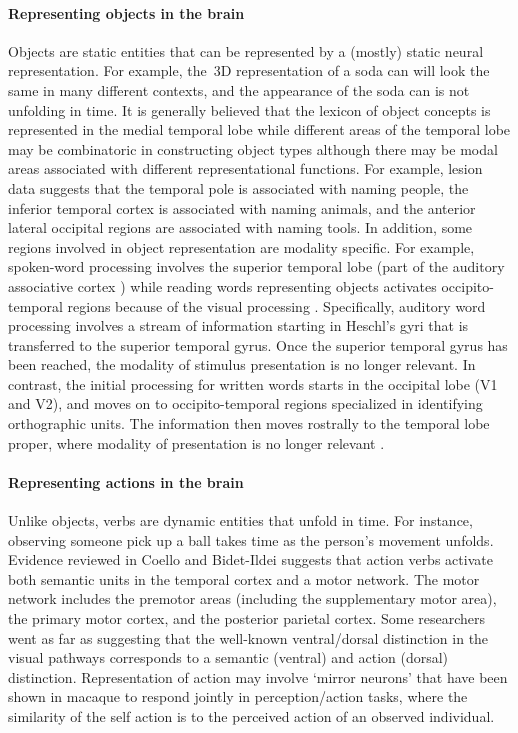 \paragraph{Representing objects in the brain}
%
Objects are static entities that can be represented by a (mostly) static
neural representation.
%
For example, the~3D representation of a soda can will look the same in many
different contexts, and the appearance of the soda can is not unfolding in
time.
%
It is generally believed that the lexicon of object concepts is represented in
the medial temporal lobe while different areas of the temporal lobe may be
combinatoric in constructing object types \citep{hanson2004combinatorial}
although there may be modal areas associated with different representational
functions.
%
For example, lesion data suggests that the temporal pole is associated with
naming people, the inferior temporal cortex is associated with naming
animals, and the anterior lateral occipital regions are associated with naming
tools.
%
In addition, some regions involved in object representation are
modality specific.
%
For example, spoken-word processing involves the superior temporal lobe (part
of the auditory associative cortex \citep{binder2000human}) while reading
words representing objects activates occipito-temporal regions because of the
visual processing \citep{puce1996differential}.
%
Specifically, auditory word processing involves a stream of information
starting in Heschl's gyri that is transferred to the superior temporal gyrus.
%
Once the superior temporal gyrus has been reached, the modality of stimulus
presentation is no longer relevant.
%
In contrast, the initial processing for written words starts in the occipital
lobe (V1 and V2), and moves on to occipito-temporal regions specialized in
identifying orthographic units.
%
The information then moves rostrally to the temporal lobe proper, where
modality of presentation is no longer relevant \citep{binder2000human}.

\paragraph{Representing actions in the brain}
%
Unlike objects, verbs are dynamic entities that unfold in time.
%
For instance, observing someone pick up a ball takes time as the person's
movement unfolds.
%
Evidence reviewed in Coello and Bidet-Ildei \cite{coello2012motor}
suggests that action verbs activate both semantic units in the
temporal cortex and a motor network.
%
The motor network includes the premotor areas (including the supplementary
motor area), the primary motor cortex, and the posterior parietal cortex.
%
Some researchers went as far as suggesting that the well-known ventral/dorsal
distinction in the visual pathways corresponds to a semantic (ventral) and
action (dorsal) distinction.
%
Representation of action may involve `mirror neurons' that have been shown in
macaque to respond jointly in perception/action tasks, where the similarity of
the self action is to the perceived action of an observed individual.

